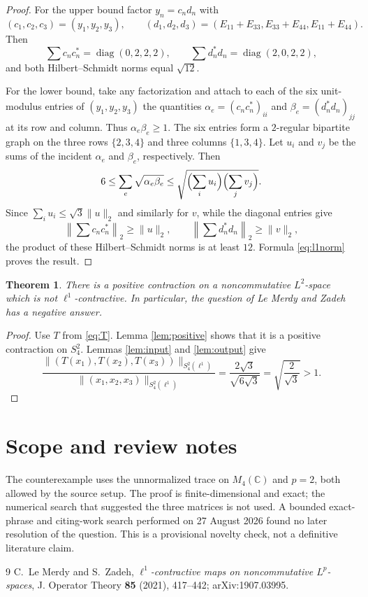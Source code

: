 \documentclass[11pt]{article}
\newtheorem{theorem}{Theorem}
\begin{document}
\begin{proof}
For the upper bound factor $y_n=c_nd_n$ with
\[
 (c_1,c_2,c_3)=(y_1,y_2,y_3),\qquad
 (d_1,d_2,d_3)=(E_{11}+E_{33},E_{33}+E_{44},E_{11}+E_{44}).
\]
Then
\[
 \sum c_nc_n^*=\operatorname{diag}(0,2,2,2),
 \qquad
 \sum d_n^*d_n=\operatorname{diag}(2,0,2,2),
\]
and both Hilbert--Schmidt norms equal $\sqrt{12}$.

For the lower bound, take any factorization and attach to each of the six
unit-modulus entries of $(y_1,y_2,y_3)$ the quantities
$\alpha_e=(c_nc_n^*)_{ii}$ and
$\beta_e=(d_n^*d_n)_{jj}$ at its row and column.  Thus
$\alpha_e\beta_e\geq1$.  The six entries form a $2$-regular bipartite
graph on the three rows $\{2,3,4\}$ and three columns $\{1,3,4\}$.
Let $u_i$ and $v_j$ be the sums of the incident $\alpha_e$ and
$\beta_e$, respectively.  Then
\[
 6\leq\sum_e\sqrt{\alpha_e\beta_e}
 \leq\sqrt{\Bigl(\sum_i u_i\Bigr)\Bigl(\sum_j v_j\Bigr)}.
\]
Since $\sum_i u_i\leq\sqrt3\|u\|_2$ and similarly for $v$,
while the diagonal entries give
\[
 \left\|\sum c_nc_n^*\right\|_2\geq\|u\|_2,
 \qquad
 \left\|\sum d_n^*d_n\right\|_2\geq\|v\|_2,
\]
the product of these Hilbert--Schmidt norms is at least $12$.
Formula \eqref{eq:l1norm} proves the result.
\end{proof}

\begin{theorem}
There is a positive contraction on a noncommutative $L^2$-space which is
not $\ell^1$-contractive.  In particular, the question of Le Merdy and
Zadeh has a negative answer.
\end{theorem}

\begin{proof}
Use $T$ from \eqref{eq:T}.  Lemma \ref{lem:positive} shows that it is a
positive contraction on $S_4^2$.  Lemmas \ref{lem:input} and
\ref{lem:output} give
\[
 \frac{\|(T(x_1),T(x_2),T(x_3))\|_{S_4^2(\ell^1)}}
 {\|(x_1,x_2,x_3)\|_{S_4^2(\ell^1)}}
 =\frac{2\sqrt3}{\sqrt{6\sqrt3}}
 =\sqrt{\frac2{\sqrt3}}>1.
\]
\end{proof}

\section{Scope and review notes}

The counterexample uses the unnormalized trace on $M_4(\mathbb C)$ and
$p=2$, both allowed by the source setup.  The proof is finite-dimensional
and exact; the numerical search that suggested the three matrices is not
used.  A bounded exact-phrase and citing-work search performed on 27 August
2026 found no later resolution of the question.  This is a provisional
novelty check, not a definitive literature claim.

\begin{thebibliography}{9}
C.~Le Merdy and S.~Zadeh,
\emph{$\ell^1$-contractive maps on noncommutative $L^p$-spaces},
J. Operator Theory \textbf{85} (2021), 417--442;
arXiv:1907.03995.
\end{thebibliography}
\end{document}
